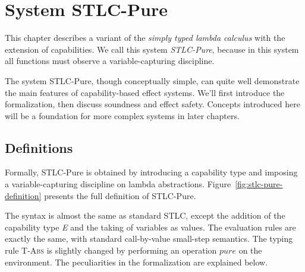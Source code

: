 \section{System STLC-Pure}

This chapter describes a variant of the \emph{simply typed
  lambda calculus} with the extension of capabilities. We call this
system \emph{STLC-Pure}, because in this system all functions must
observe a variable-capturing discipline.


The system STLC-Pure, though conceptually simple, can quite well
demonstrate the main features of capability-based effect
systems. We'll first introduce the formalization, then discuss
soundness and effect safety. Concepts introduced here will be a
foundation for more complex systems in later chapters.

\subsection{Definitions}

Formally, STLC-Pure is obtained by introducing a capability type and
imposing a variable-capturing discipline on lambda abstractions.
Figure~\ref{fig:stlc-pure-definition} presents the full definition of
STLC-Pure.

The syntax is almost the same as standard STLC, except the addition of
the capability type \emph{E} and the taking of variables as
values. The evaluation rules are exactly the same, with standard
call-by-value small-step semantics. The typing rule \textsc{T-Abs} is
slightly changed by performing an operation $pure$ on the
environment. The peculiarities in the formalization are explained
below.

